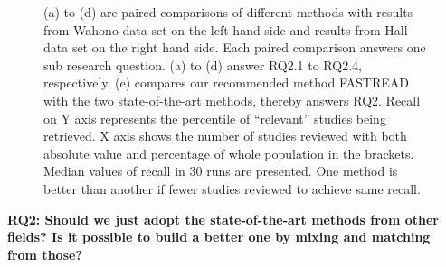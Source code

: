 \documentclass[final,twocolumn,5p]{elsarticle}
\theoremstyle{break}
\begin{document}
\begin{figure}
{        \label{fig:2nd}
    }
    \quad
    \quad
    
    
    
    \caption{(a) to (d) are paired comparisons of different methods with results from Wahono data set on the left hand side and results from Hall data set on the right hand side. Each paired comparison answers one sub research question. (a) to (d) answer RQ2.1 to RQ2.4, respectively. (e) compares our recommended method FASTREAD with the two state-of-the-art methods, thereby answers RQ2. Recall on Y axis represents the percentile of ``relevant'' studies being retrieved. X axis shows the number of studies reviewed with both absolute value and percentage of whole population in the brackets. Median values of recall in $30$ runs are presented.  One method is better than another if fewer studies reviewed to achieve same recall.
    }
    \label{fig:detail}
\end{figure}



{\bf RQ2: Should we just adopt the state-of-the-art methods from other fields? Is it possible to build a better one by mixing and matching from those?}
\end{document}
